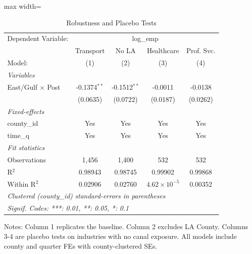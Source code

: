 
\begin{table}[htbp]
   \caption{\label{tab:robust} Robustness and Placebo Tests}
   \centering
   \begin{adjustbox}{max width=\textwidth}
   \begin{tabular}{lcccc}
      \tabularnewline \midrule \midrule
      Dependent Variable: & \multicolumn{4}{c}{log\_emp}\\
                               & Transport      & No LA          & Healthcare            & Prof. Svc. \\   
      Model:                   & (1)            & (2)            & (3)                   & (4)\\  
      \midrule
      \emph{Variables}\\
      East/Gulf $\times$ Post  & -0.1374$^{**}$ & -0.1512$^{**}$ & -0.0011               & -0.0138\\   
                               & (0.0635)       & (0.0722)       & (0.0187)              & (0.0262)\\   
      \midrule
      \emph{Fixed-effects}\\
      county\_id               & Yes            & Yes            & Yes                   & Yes\\  
      time\_q                  & Yes            & Yes            & Yes                   & Yes\\  
      \midrule
      \emph{Fit statistics}\\
      Observations             & 1,456          & 1,400          & 532                   & 532\\  
      R$^2$                    & 0.98943        & 0.98745        & 0.99902               & 0.99868\\  
      Within R$^2$             & 0.02906        & 0.02760        & $4.62\times 10^{-5}$  & 0.00352\\  
      \midrule \midrule
      \multicolumn{5}{l}{\emph{Clustered (county\_id) standard-errors in parentheses}}\\
      \multicolumn{5}{l}{\emph{Signif. Codes: ***: 0.01, **: 0.05, *: 0.1}}\\
   \end{tabular}
   \end{adjustbox}

   \par \raggedright
   Notes: Column 1 replicates the baseline. Column 2 excludes LA County. Columns 3-4 are placebo tests on industries with no canal exposure. All models include county and quarter FEs with county-clustered SEs.
\end{table}


